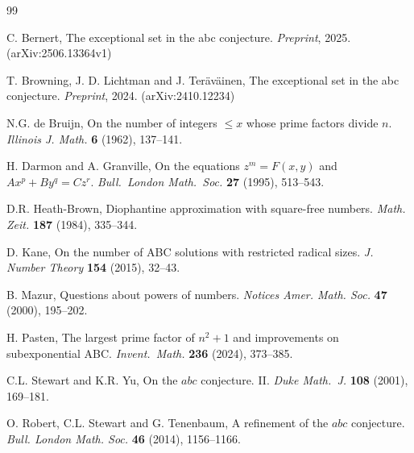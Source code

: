 \documentclass[a4paper,11pt,twoside,reqno]{amsart}
\renewcommand{\leq}{\leqslant}
\theoremstyle{plain}
\theoremstyle{remark}
\numberwithin{prop}{section}
\numberwithin{equation}{section}
\begin{document}
\begin{thebibliography}{99}

C. Bernert, The exceptional set in the abc conjecture.
{\em Preprint}, 2025. (arXiv:2506.13364v1) 

T. Browning,  J. D. Lichtman and J. Ter\"av\"ainen,
The exceptional set in the abc conjecture.
{\em Preprint}, 2024. (arXiv:2410.12234) 

N.G. de Bruijn,
On the number of integers {$\leq x$} whose prime factors
              divide {$n$}.
              {\em Illinois J. Math.} {\bf 6} (1962), {137--141}.

H. Darmon and A. Granville, 
On the equations $z^m=F(x,y)$ and $Ax^p+By^q=Cz^r$. {\em Bull.\ London Math.\ Soc.} {\bf 27}
(1995), 513--543.

 D.R. Heath-Brown,
Diophantine approximation with square-free numbers.
{\em Math. Zeit.} {\bf 187} (1984), {335--344}.


D. Kane, 
On the number of ABC solutions with restricted radical sizes.
{\em J. Number Theory} {\bf 154} (2015), 32--43.

B. Mazur, 
Questions about powers of numbers. 
{\em Notices Amer. Math. Soc.} {\bf 47} (2000), 195--202.

H. Pasten,
 The largest prime factor of  $n^2+1$  and improvements on subexponential  ABC.
{\em Invent.\ Math.} {\bf 236} (2024), 373--385.

C.L. Stewart and K.R. Yu, 
On the $abc$ conjecture. II.
{\it Duke Math.\ J.} {\bf 108} (2001), 169--181.

O. Robert, C.L. Stewart and G. Tenenbaum,
A refinement of the $abc$ conjecture.
{\it Bull. London Math. Soc.} {\bf 46}
(2014), 1156--1166.

\end{thebibliography}
\end{document}
